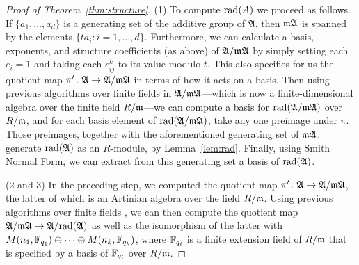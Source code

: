 \begin{enumerate}
\begin{enumerate}
\begin{proof}[Proof of Theorem~\ref{thm:structure}] 
(1) To compute $\mathrm{rad}(A)$ we proceed as follows. If $\{a_1, \dotsc, a_d\}$ is a generating set of the additive group of $\mathfrak{A}$, then $\mathfrak{m} \mathfrak{A}$ is spanned by the elements $\{ta_i : i = 1, \dotsc, d\}$. Furthermore, we can calculate a basis, exponents, and structure coefficients (as above) of $\mathfrak{A}/\mathfrak{m} \mathfrak{A}$ by simply setting each $e_i=1$ and taking each $c_{ij}^k$ to its value modulo $t$. This also specifies for us the quotient map $\pi' \colon \mathfrak{A} \to \mathfrak{A}/\mathfrak{m} \mathfrak{A}$ in terms of how it acts on a basis. Then using previous algorithms over finite fields \cite{Ron90,EG00,Iva00} in $\mathfrak{A}/\mathfrak{m} \mathfrak{A}$---which is now a finite-dimensional algebra over the finite field $R/\mathfrak{m}$---we can compute a basis for $\mathrm{rad}(\mathfrak{A}/\mathfrak{m} \mathfrak{A})$ over $R/\mathfrak{m}$, and for each basis element of $\mathrm{rad}(\mathfrak{A}/\mathfrak{m} \mathfrak{A})$, take any one preimage under $\pi$. Those preimages, together with the aforementioned generating set of $\mathfrak{m} \mathfrak{A}$, generate $\mathrm{rad}(\mathfrak{A})$ as an $R$-module, by Lemma~\ref{lem:rad}. Finally, using Smith Normal Form, we can extract from this generating set a basis of $\mathrm{rad}(\mathfrak{A})$.

(2 and 3) In the preceding step, we computed the quotient map $\pi' \colon \mathfrak{A} \to \mathfrak{A} / \mathfrak{m} \mathfrak{A}$, the latter of which is an Artinian algebra over the field $R/\mathfrak{m}$. Using previous algorithms over finite fields \cite{Ron90,EG00,Iva00}, we can then compute the quotient map $\mathfrak{A} / \mathfrak{m} \mathfrak{A} \to \mathfrak{A} / \mathrm{rad}(\mathfrak{A})$ as well as the isomorphism of the latter with $M(n_1, \mathbb{F}_{q_1}) \oplus \dotsb \oplus M(n_k, \mathbb{F}_{q_k})$, where $\mathbb{F}_{q_i}$ is a finite extension field of $R/\mathfrak{m}$ that is specified by a basis of $\mathbb{F}_{q_i}$ over $R/\mathfrak{m}$.


\end{proof}
\end{enumerate}
\end{enumerate}
